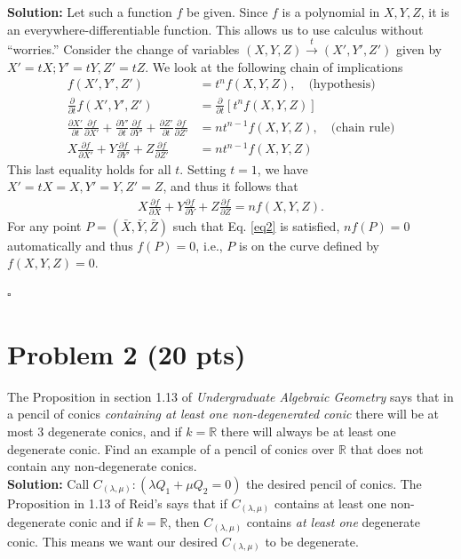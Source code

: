 \documentclass[12pt]{article}
\newcommand{\p}{\partial}
\newcommand{\nn}{\nonumber}
\newcommand{\f}[2]{\frac{#1}{#2}}
\begin{document}
\noindent \textbf{Solution:} Let such a function $f$ be given. Since $f$ is a polynomial in $X,Y,Z$, it is an everywhere-differentiable function. This allows us to use calculus without ``worries.'' Consider the change of variables $(X,Y,Z) \xrightarrow{t} (X',Y',Z')$ given by $X'=tX; Y'=tY, Z'=tZ$. We look at the following chain of implications
\begin{align*}
f(X',Y',Z') &= t^n f(X,Y,Z), \quad \text{(hypothesis)}\nn\\
\f{\p}{\p t} f(X',Y',Z') &= \f{\p }{\p t} [t^n f(X,Y,Z)]\nn\\
\f{\p X'}{\p t}\f{\p f}{\p X'} + \f{\p Y'}{\p t}\f{\p f}{\p Y'} + \f{\p Z'}{\p t}\f{\p f}{\p Z'} &= nt^{n-1}f(X,Y,Z), \quad \text{(chain rule)}\nn\\
X\f{\p f}{\p X'} + Y\f{\p f}{\p Y'} + Z\f{\p f}{\p Z'}&= nt^{n-1}f(X,Y,Z)
\end{align*}
This last equality holds for all $t$. Setting $t=1$, we have $X' = tX = X, Y'=Y, Z'=Z$, and thus it follows that
\begin{align*}
X\f{\p f}{\p X} + Y\f{\p f}{\p Y} + Z\f{\p f}{\p Z}= nf(X,Y,Z).
\end{align*}
For any point $P = (\bar{X},\bar{Y}, \bar{Z})$ such that Eq. \eqref{eq2} is satisfied, $nf(P) = 0$ automatically and thus $f(P) = 0$, i.e., $P$ is on the curve defined by $f(X,Y,Z) = 0$. 

\hfill $\square$

\newpage



\section*{Problem 2 \small{(20 pts)}}
The Proposition in section 1.13 of \textit{Undergraduate Algebraic Geometry} says that in a pencil of conics \textit{containing at least one non-degenerated conic} there will be at most 3 degenerate conics, and if $k = \mathbb{R}$ there will always be at least one degenerate conic. Find an example of a pencil of conics over $\mathbb{R}$ that does not contain any non-degenerate conics. \\





\noindent \textbf{Solution:} Call $C_{(\lambda,\mu)}: (\lambda Q_1 + \mu Q_2 = 0)$ the desired pencil of conics. The Proposition in 1.13 of Reid's says that if $C_{(\lambda,\mu)}$ contains at least one non-degenerate conic and if $k=\mathbb{R}$, then $C_{(\lambda,\mu)}$ contains \textit{at least one} degenerate conic. This means we want our desired $C_{(\lambda,\mu)}$ to be degenerate.\\
\end{document}

